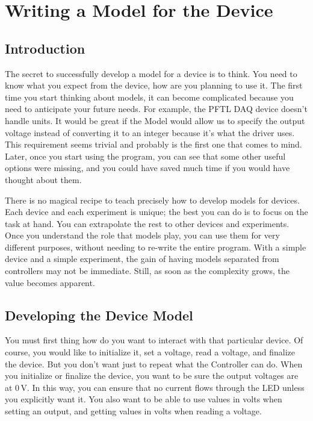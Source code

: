 \chapter{Writing a Model for the Device}\label{ch:device-model}

\section{Introduction}\label{sec:device-model-introduction}
The secret to successfully develop a model for a device is to think. You need to know what you expect from the device, how are you planning to use it. The first time you start thinking about models, it can become complicated because you need to anticipate your future needs. For example, the {PFTL DAQ} device doesn't handle units. It would be great if the Model would allow us to specify the output voltage instead of converting it to an integer because it's what the driver uses. This requirement seems trivial and probably is the first one that comes to mind. Later, once you start using the program, you can see that some other useful options were missing, and you could have saved much time if you would have thought about them.

There is no magical recipe to teach precisely how to develop models for devices. Each device and each experiment is unique; the best you can do is to focus on the task at hand. You can extrapolate the rest to other devices and experiments. Once you understand the role that models play, you can use them for very different purposes, without needing to re-write the entire program. With a simple device and a simple experiment, the gain of having models separated from controllers may not be immediate. Still, as soon as the complexity grows, the value becomes apparent.


\section{Developing the Device Model}\label{sec:device-model}
You must first thing how do you want to interact with that particular device. Of course, you would like to initialize it, set a voltage, read a voltage, and finalize the device. But you don't want just to repeat what the Controller can do. When you initialize or finalize the device, you want to be sure the output voltages are at $0\,\textrm{V}$. In this way, you can ensure that no current flows through the LED unless you explicitly want it. You also want to be able to use values in volts when setting an output, and getting values in volts when reading a voltage.

